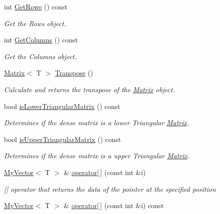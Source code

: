 \begin{DoxyCompactItemize}
int \mbox{\hyperlink{class_matrix_aa665db4bc173a7bb4ec3f9da2676dfa6}{Get\+Rows}} () const
\begin{DoxyCompactList}\small\item\em Get the Rows object. \end{DoxyCompactList}\item 
int \mbox{\hyperlink{class_matrix_ada60917bb197292e0645992e108c2c2f}{Get\+Columns}} () const
\begin{DoxyCompactList}\small\item\em Get the Columns object. \end{DoxyCompactList}\item 
\mbox{\hyperlink{class_matrix}{Matrix}}$<$ T $>$ \mbox{\hyperlink{class_matrix_a86d55a5db43b641f4e8fb2b302ccc599}{Transpose}} ()
\begin{DoxyCompactList}\small\item\em Calculate and returns the transpose of the \mbox{\hyperlink{class_matrix}{Matrix}} object. \end{DoxyCompactList}\item 
bool \mbox{\hyperlink{class_matrix_a6e1df160cc8cb63f5b0bb58398b6e7ca}{is\+Lower\+Triangular\+Matrix}} () const
\begin{DoxyCompactList}\small\item\em Determines if the dense matrix is a lower Triangular \mbox{\hyperlink{class_matrix}{Matrix}}. \end{DoxyCompactList}\item 
bool \mbox{\hyperlink{class_matrix_a3d177e2d4c6d8ccf7a1c4c651f4bc075}{is\+Upper\+Triangular\+Matrix}} () const
\begin{DoxyCompactList}\small\item\em Determines if the dense matrix is a upper Triangular \mbox{\hyperlink{class_matrix}{Matrix}}. \end{DoxyCompactList}\item 
\mbox{\hyperlink{class_my_vector}{My\+Vector}}$<$ T $>$ \& \mbox{\hyperlink{class_matrix_aa9532c87a69bef256954e2309ca3fdd6}{operator\mbox{[}$\,$\mbox{]}}} (const int \&i)
\begin{DoxyCompactList}\small\item\em \mbox{[}\mbox{]} operator that returns the data of the pointer at the specified position \end{DoxyCompactList}\item 
\mbox{\hyperlink{class_my_vector}{My\+Vector}}$<$ T $>$ \& \mbox{\hyperlink{class_matrix_a56c7f18f272e74bee2b616eba702fc87}{operator\mbox{[}$\,$\mbox{]}}} (const int \&i) const

\end{DoxyCompactItemize}
